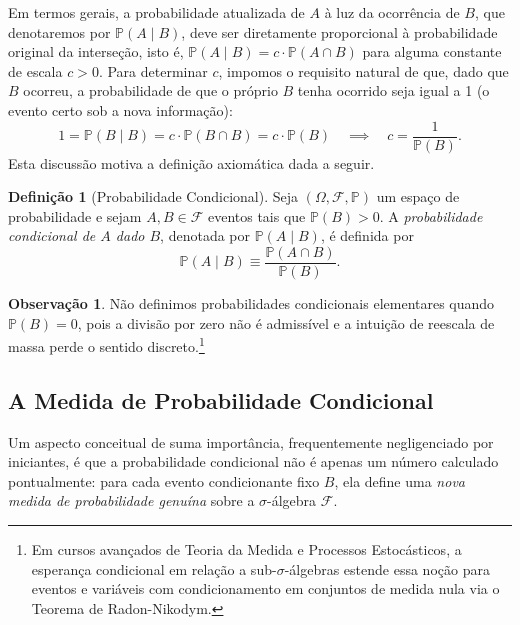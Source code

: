 \documentclass[12pt,portuguese]{article}
\theoremstyle{definition}
\newtheorem{definition}[definition]{Definição}
\newtheorem{remark}[remark]{Observação}
\begin{document}
Em termos gerais, a probabilidade atualizada de \(A\) à luz da ocorrência de \(B\), que denotaremos por \(\mathbb{P}(A \mid B)\), deve ser diretamente proporcional à probabilidade original da interseção, isto é, \(\mathbb{P}(A \mid B) = c \cdot \mathbb{P}(A \cap B)\) para alguma constante de escala \(c > 0\). Para determinar \(c\), impomos o requisito natural de que, dado que \(B\) ocorreu, a probabilidade de que o próprio \(B\) tenha ocorrido seja igual a 1 (o evento certo sob a nova informação):
\[
  1 = \mathbb{P}(B \mid B) = c \cdot \mathbb{P}(B \cap B) = c \cdot \mathbb{P}(B)
  \quad\implies\quad
  c = \frac{1}{\mathbb{P}(B)}.
\]
Esta discussão motiva a definição axiomática dada a seguir.

\begin{definition}[Probabilidade Condicional]\label{def:prob-cond}
Seja \((\Omega, \mathcal{F}, \mathbb{P})\) um espaço de probabilidade e sejam \(A, B \in \mathcal{F}\) eventos tais que \(\mathbb{P}(B) > 0\). A \emph{probabilidade condicional de \(A\) dado \(B\)}, denotada por \(\mathbb{P}(A \mid B)\), é definida por
\begin{equation}\label{eq:prob-cond}
  \mathbb{P}(A \mid B) \equiv  \frac{\mathbb{P}(A \cap B)}{\mathbb{P}(B)}.
\end{equation}
\end{definition}

\begin{remark}
Não definimos probabilidades condicionais elementares quando \(\mathbb{P}(B) = 0\), pois a divisão por zero não é admissível e a intuição de reescala de massa perde o sentido discreto.\footnote{Em cursos avançados de Teoria da Medida e Processos Estocásticos, a esperança condicional em relação a sub-\(\sigma\)-álgebras estende essa noção para eventos e variáveis com condicionamento em conjuntos de medida nula via o Teorema de Radon-Nikodym.}
\end{remark}

\subsection{A Medida de Probabilidade Condicional}

Um aspecto conceitual de suma importância, frequentemente negligenciado por iniciantes, é que a probabilidade condicional não é apenas um número calculado pontualmente: para cada evento condicionante fixo \(B\), ela define uma \emph{nova medida de probabilidade genuína} sobre a \(\sigma\)-álgebra \(\mathcal{F}\).
\end{document}

